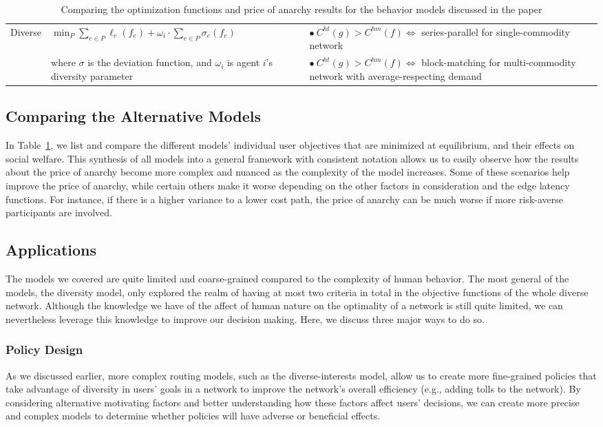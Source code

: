 \begin{table}[h]
\begin{center}
\begin{tabular}{|p{2cm}| p{6cm} | p{7cm}|}
\hline
     Diverse &$ \min_P \sum_{e\in P} \ell_e(f_e) + \omega_i\cdot \sum_{e\in P}\sigma_e(f_e) $ 
    & $\bullet~C^{ht}(g)> C^{hm}(f) \iff $ series-parallel for single-commodity network\\
    & where $\sigma$ is the deviation function, and $\omega_i$ is agent $i$'s diversity parameter & $\bullet~C^{ht}(g)> C^{hm}(f) \iff $ block-matching for multi-commodity network with average-respecting demand\\
\hline
\end{tabular}
\end{center}
    \caption{Comparing the optimization functions and price of anarchy results for the behavior models discussed in the paper}
    \label{tab:comparison}
\end{table}

\subsection{Comparing the Alternative Models}
In Table~\ref{tab:comparison}, we list and compare the different models' individual user objectives that are minimized at equilibrium, and their effects on social welfare.
This synthesis of all models into a general framework with consistent notation allows us to easily observe how the results about the price of anarchy become more complex and nuanced as the complexity of the model increases. Some of these scenarios help improve the price of anarchy, while certain others make it worse depending on the other factors in
consideration and the edge latency functions. For instance, if there is a higher variance to a lower cost path, the price of anarchy can be much worse if more risk-averse participants are involved.

\subsection{Applications}
The models we covered are quite limited and coarse-grained compared to the complexity of human behavior. The most general of the models, the diversity model, only explored the realm of having at most two criteria in total in the objective functions of the whole diverse network.
Although the knowledge we have of the affect of human nature on the optimality of a network is still quite limited, we can nevertheless leverage this knowledge to improve our decision making. Here, we discuss three major ways to do so.

\subsubsection{Policy Design}
As we discussed earlier, more complex routing models, such as the diverse-interests model, allow us to create more fine-grained policies that take advantage of diversity in users' goals in a network to improve the network's overall efficiency (e.g., adding tolls to the network).
By considering alternative motivating factors and better understanding how these factors affect users' decisions, we can create more precise and complex models to determine whether policies will have adverse or beneficial effects.

